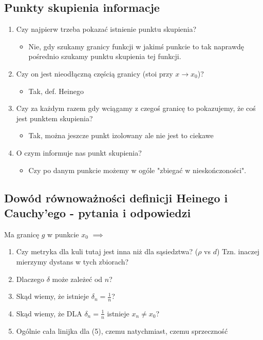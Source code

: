 \documentclass{article}
\begin{document}
\subsection{Punkty skupienia informacje}

\begin{enumerate}
    \item Czy najpierw trzeba pokazać istnienie punktu skupienia?
    \begin{itemize}
        \item Nie, gdy szukamy granicy funkcji w jakimś punkcie to tak naprawdę pośrednio szukamy punktu skupienia tej funkcji.
    \end{itemize}
    \item Czy on jest nieodłączną częścią granicy (stoi przy \(x \to x_0\))?
    \begin{itemize}
        \item Tak, def. Heinego
    \end{itemize}
    \item Czy za każdym razem gdy wciągamy z czegoś granicę to pokazujemy, że coś jest punktem skupienia?
    \begin{itemize}
        \item Tak, można jeszcze punkt izolowany ale nie jest to ciekawe
    \end{itemize}
    \item O czym informuje nas punkt skupienia?
    \begin{itemize}
        \item Czy po danym punkcie możemy w ogóle "zbiegać w nieskończoności".
    \end{itemize}
\end{enumerate}

\subsection{Dowód równoważności definicji Heinego i Cauchy'ego - pytania i odpowiedzi}

Ma granicę \(g\) w punkcie \(x_0\) \(\implies\)

\begin{enumerate}
    \item Czy metryka dla kuli tutaj jest inna niż dla sąsiedztwa? (\(\rho\) vs \(d\)) Tzn. inaczej mierzymy dystans w tych zbiorach?
    \item Dlaczego \(\delta\) może zależeć od \(n\)?
    \item Skąd wiemy, że istnieje \(\delta_n = \frac{1}{n}\)?
    \item Skąd wiemy, że DLA \(\delta_n = \frac{1}{n}\) istnieje \(x_n \neq x_0\)?
    \item Ogólnie cała linijka dla (5), czemu natychmiast, czemu sprzeczność
\end{enumerate}
\end{document}
